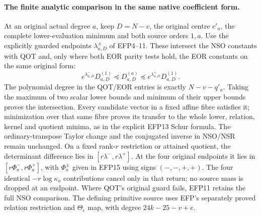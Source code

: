 \documentclass[11pt,a4paper]{article}
\providecommand{\C}{\mathbb C}
\providecommand{\R}{\mathbb R}
\begin{document}
\paragraph{The finite analytic comparison in the same native coefficient form.}
At an original actual degree $a$, keep $D=N-v$, the original centre $c'_a$,
the complete lower-evaluation minimum and both source orders $1,a$.
Use the explicitly guarded endpoints $\lambda^\pm_{a,D}$ of EFP4--11.
These intersect the NSO constants with QOT and, only where both EOR
parity tests hold, the EOR constants on the same original form:
\[
e^{\lambda^-_{a,D}}D_{a,D}^{(1)}
 \preceq D_{a,D}^{(a)}
 \preceq e^{\lambda^+_{a,D}}D_{a,D}^{(1)}.
\tag{EFR1}
\]
The polynomial degree in the QOT/EOR entries is exactly $N-v-q'_a$.
Taking the maximum of two scalar lower bounds and minimum of their
upper bounds proves the intersection. Every candidate vector in a
fixed affine fibre satisfies it; minimization over that same fibre
proves its transfer to the whole lower, relation, kernel and quotient
minima, as in the explicit EFP13 Schur formula. The ordinary-transpose
Taylor change and the conjugated inverse in NSO/NSR remain unchanged.
On a fixed rank-$r$ restriction or attained quotient, the determinant
difference lies in $[r\lambda^-,r\lambda^+]$.
At the four original endpoints it lies in
$[r\Phi_a^-,r\Phi_a^+]$, with $\Phi_a^\pm$ given in EFP15 using
signs $(-,-,+,+)$. The four identical $-r\log\kappa_a$ contributions
cancel only in that return; no source mass is dropped at an endpoint.
Where QOT's original guard fails, EFP11 retains the full NSO comparison.
The defining primitive source uses EFP's separately proved relation
restriction and $\Theta_e$ map, with degree $24k-25-v+e$.



\endgroup


\clearpage
\clearpage
\begingroup
\providecommand{\im}{\operatorname{im}}
\providecommand{\rank}{\operatorname{rank}}
\begingroup
\def\arsinh{\operatorname{arsinh}}
\def\im{\operatorname{im}}
\def\rank{\operatorname{rank}}
\def\Gr{\operatorname{Gram}}
\def\R{\mathbb R}
\def\C{\mathbb C}
\def\norm#1{\left\lVert#1\right\rVert}
\newtheorem{QOTtheorem}{Theorem}[subsection]
\newtheorem{QOTlemma}[QOTtheorem]{Lemma}
\newtheorem{QOTcorollary}[QOTtheorem]{Corollary}
\renewcommand{\theQOTtheorem}{QOT\arabic{subsection}.\arabic{QOTtheorem}}
\end{document}
